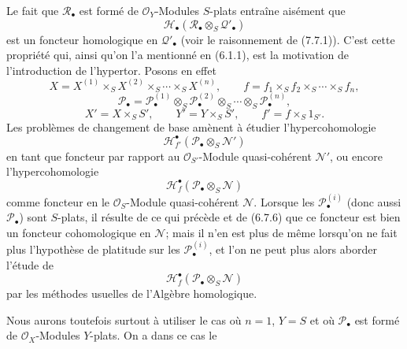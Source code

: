 \begin{scholium}[6.10.4]
Le fait que $\mathscr R_\bullet$ est formé de $\mathscr O_Y$-Modules
$S$-plats entraîne aisément que
\[
  \mathscr H_\bullet
  (\mathscr R_\bullet\otimes_S\mathscr Q'_\bullet)
\]
est un foncteur homologique en $\mathscr Q'_\bullet$ (voir le raisonnement de
(7.7.1)). C'est cette propriété qui, ainsi qu'on l'a mentionné en (6.1.1), est
la motivation de l'introduction de l'hypertor. Posons en effet
\[
  X=X^{(1)}\times_SX^{(2)}\times_S\cdots\times_SX^{(n)},
  \qquad
  f=f_1\times_Sf_2\times_S\cdots\times_Sf_n,
\]
\[
  \mathscr P_\bullet
  =
  \mathscr P_\bullet^{(1)}
  \otimes_S\mathscr P_\bullet^{(2)}
  \otimes_S\cdots\otimes_S\mathscr P_\bullet^{(n)},
\]
\[
  X'=X\times_SS',
  \qquad
  Y'=Y\times_SS',
  \qquad
  f'=f\times_S1_{S'}.
\]
Les problèmes de changement de base amènent à étudier l'hypercohomologie
\[
  \mathscr H^\bullet_{f'}
  (\mathscr P_\bullet\otimes_S\mathscr N')
\]
en tant que foncteur par rapport au $\mathscr O_{S'}$-Module quasi-cohérent
$\mathscr N'$, ou encore l'hypercohomologie
\[
  \mathscr H^\bullet_f
  (\mathscr P_\bullet\otimes_S\mathscr N)
\]
comme foncteur en le $\mathscr O_S$-Module quasi-cohérent $\mathscr N$. Lorsque
les $\mathscr P_\bullet^{(i)}$ (donc aussi $\mathscr P_\bullet$) sont
$S$-plats, il résulte de ce qui précède et de (6.7.6) que ce foncteur est bien
un foncteur cohomologique en $\mathscr N$; mais il n'en est plus de même
lorsqu'on ne fait plus l'hypothèse de platitude sur les
$\mathscr P_\bullet^{(i)}$, et l'on ne peut plus alors aborder l'étude de
\[
  \mathscr H^\bullet_f
  (\mathscr P_\bullet\otimes_S\mathscr N)
\]
par les méthodes usuelles de l'Algèbre homologique.

Nous aurons toutefois surtout à utiliser le cas où $n=1$, $Y=S$ et où
$\mathscr P_\bullet$ est formé de $\mathscr O_X$-Modules $Y$-plats. On a dans
ce cas le
\end{scholium}

